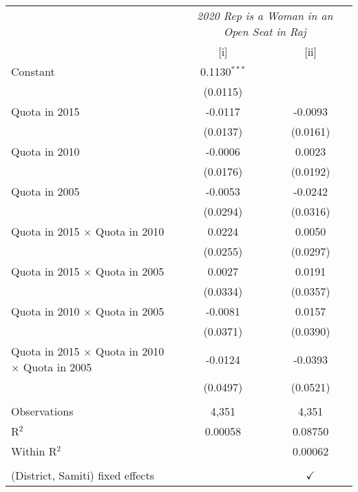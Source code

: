 
\begingroup
\centering
\begin{tabular}{lcc}
   \toprule
    & \multicolumn{2}{c}{\textit{2020 Rep is a Woman in an Open Seat in Raj}}\\
                                                                   & [i]            & [ii]\\  
   \midrule 
   Constant                                                        & 0.1130$^{***}$ &   \\   
                                                                   & (0.0115)       &   \\   
   Quota in 2015                                                   & -0.0117        & -0.0093\\   
                                                                   & (0.0137)       & (0.0161)\\   
   Quota in 2010                                                   & -0.0006        & 0.0023\\   
                                                                   & (0.0176)       & (0.0192)\\   
   Quota in 2005                                                   & -0.0053        & -0.0242\\   
                                                                   & (0.0294)       & (0.0316)\\   
   Quota in 2015 $\times $ Quota in 2010                           & 0.0224         & 0.0050\\   
                                                                   & (0.0255)       & (0.0297)\\   
   Quota in 2015 $\times $ Quota in 2005                           & 0.0027         & 0.0191\\   
                                                                   & (0.0334)       & (0.0357)\\   
   Quota in 2010 $\times $ Quota in 2005                           & -0.0081        & 0.0157\\   
                                                                   & (0.0371)       & (0.0390)\\   
   Quota in 2015 $\times $ Quota in 2010 $\times $ Quota in 2005   & -0.0124        & -0.0393\\   
                                                                   & (0.0497)       & (0.0521)\\   
    \\
   Observations                                                    & 4,351          & 4,351\\  
   R$^2$                                                           & 0.00058        & 0.08750\\  
   Within R$^2$                                                    &                & 0.00062\\  
    \\
   (District, Samiti) fixed effects                                &                & $\checkmark$\\   
   \bottomrule
\end{tabular}
\par\endgroup


